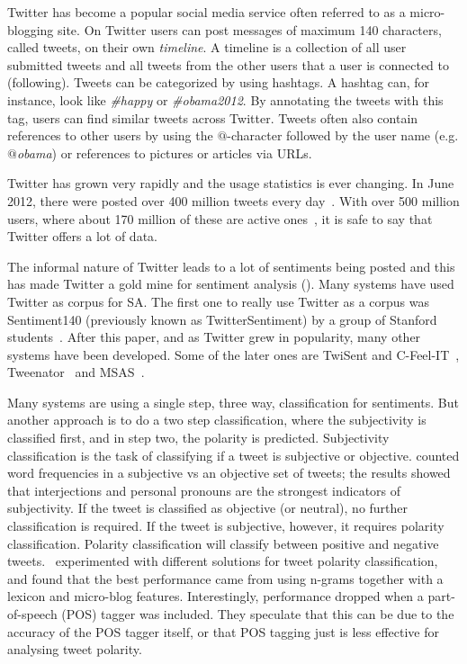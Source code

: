 Twitter has become a popular social media service often referred to as a micro-blogging site. On Twitter users can post messages of maximum 140 characters, called tweets, on their own \emph{timeline}. A timeline is a collection of all user submitted tweets and all tweets from the other users that a user is connected to (following). Tweets can be categorized by using hashtags. A hashtag can, for instance, look like \emph{\#happy} or \emph{\#obama2012}. By annotating the tweets with this tag, users can find similar tweets across Twitter. Tweets often also contain references to other users by using the $@$-character followed by the user name (e.g. \emph{$@$obama}) or references to pictures or articles via URLs.

Twitter has grown very rapidly and the usage statistics is ever changing. In June 2012, there were posted over 400 million tweets every day~\citep{site:twitterusage}. With over 500 million users, where about 170 million of these are active ones~\citep{site:users}, it is safe to say that Twitter offers a lot of data.

The informal nature of Twitter leads to a lot of sentiments being posted and this has made Twitter a gold mine for sentiment analysis (). Many systems have used Twitter as corpus for SA. The first one to really use Twitter as a corpus was Sentiment140 (previously known as TwitterSentiment) by a group of Stanford students~\citep{article:go}. After this paper, and as Twitter grew in popularity, many other systems have been developed. Some of the later ones are TwiSent and C-Feel-IT~\citep{mukherjee2012twisent}, Tweenator~\citep{saif2012semantic} and MSAS~\citep{chamlertwat2012discovering}.

Many systems are using a single step, three way, classification for sentiments. But another approach is to do a two step classification, where the subjectivity is classified first, and in step two, the polarity is predicted. Subjectivity classification is the task of classifying if a tweet is subjective or objective. \cite{article:pak} counted word frequencies in a subjective vs an objective set of tweets; the results showed that interjections and personal pronouns are the strongest indicators of subjectivity. If the tweet is classified as objective (or neutral), no further classification is required. If the tweet is subjective, however, it requires polarity classification. Polarity classification will classify between positive and negative tweets.~\cite{article:omg} experimented with different solutions for tweet polarity classification, and found that the best performance came from using n-grams together with a lexicon and micro-blog features. Interestingly, performance dropped when a part-of-speech (POS) tagger was included. They speculate that this can be due to the accuracy of the POS tagger itself, or that POS tagging just is less effective for analysing tweet polarity.

